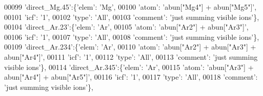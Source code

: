 \begin{DoxyCode}
00099                          \textcolor{stringliteral}{'direct\_Mg.45'}:\{\textcolor{stringliteral}{'elem'}: \textcolor{stringliteral}{'Mg'},
00100                                        \textcolor{stringliteral}{'atom'}: \textcolor{stringliteral}{'abun["Mg4"] + abun["Mg5"]'},
00101                                        \textcolor{stringliteral}{'icf'}: \textcolor{stringliteral}{'1'},
00102                                        \textcolor{stringliteral}{'type'}: \textcolor{stringliteral}{'All'},
00103                                        \textcolor{stringliteral}{'comment'}: \textcolor{stringliteral}{'just summing visible ions'}\},
00104                          \textcolor{stringliteral}{'direct\_Ar.23'}:\{\textcolor{stringliteral}{'elem'}: \textcolor{stringliteral}{'Ar'},
00105                                        \textcolor{stringliteral}{'atom'}: \textcolor{stringliteral}{'abun["Ar2"] + abun["Ar3"]'},
00106                                        \textcolor{stringliteral}{'icf'}: \textcolor{stringliteral}{'1'},
00107                                        \textcolor{stringliteral}{'type'}: \textcolor{stringliteral}{'All'},
00108                                        \textcolor{stringliteral}{'comment'}: \textcolor{stringliteral}{'just summing visible ions'}\},
00109                          \textcolor{stringliteral}{'direct\_Ar.234'}:\{\textcolor{stringliteral}{'elem'}: \textcolor{stringliteral}{'Ar'},
00110                                        \textcolor{stringliteral}{'atom'}: \textcolor{stringliteral}{'abun["Ar2"] + abun["Ar3"] + abun["Ar4"]'},
00111                                        \textcolor{stringliteral}{'icf'}: \textcolor{stringliteral}{'1'},
00112                                        \textcolor{stringliteral}{'type'}: \textcolor{stringliteral}{'All'},
00113                                        \textcolor{stringliteral}{'comment'}: \textcolor{stringliteral}{'just summing visible ions'}\},
00114                          \textcolor{stringliteral}{'direct\_Ar.345'}:\{\textcolor{stringliteral}{'elem'}: \textcolor{stringliteral}{'Ar'},
00115                                        \textcolor{stringliteral}{'atom'}: \textcolor{stringliteral}{'abun["Ar3"] + abun["Ar4"] + abun["Ar5"]'},
00116                                        \textcolor{stringliteral}{'icf'}: \textcolor{stringliteral}{'1'},
00117                                        \textcolor{stringliteral}{'type'}: \textcolor{stringliteral}{'All'},
00118                                        \textcolor{stringliteral}{'comment'}: \textcolor{stringliteral}{'just summing visible ions'}\},

\end{DoxyCode}
